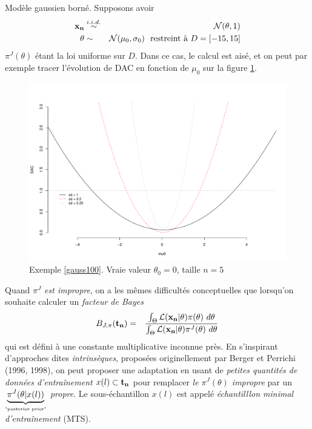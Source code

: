 \begin{exo}{Modèle gaussien borné.}\label{gauss100}
Supposons avoir \begin{eqnarray*}
{\bf x_n} & \overset{i.i.d.}{\sim} &
{\cal{N}}(\theta,1)\\
\theta & \sim & {\cal{N}}(\mu_0,\sigma_0) \ \ \text{restreint à 
$D=[-15,15]$}
\end{eqnarray*}
$\pi^J(\theta)$ étant la loi uniforme sur $D$. Dans ce cas, le calcul est aisé, et on peut par exemple tracer l'évolution de DAC en fonction de $\mu_0$ sur la figure \ref{postnormbounded1}. \\
\end{exo}

\begin{figure}[h!]
    \centering
    \includegraphics[scale=0.4]{figures/critics/postnormbounded1.pdf}
    \caption{Exemple \ref{gauss100}. Vraie valeur $\theta_0=0$, taille $n=5$}
    \label{postnormbounded1}
\end{figure}

Quand \emph{$\pi^J$ est impropre}, on a les mêmes difficultés conceptuelles que lorsqu'on souhaite calculer 
un 
\emph{facteur de Bayes}
\begin{eqnarray*}
 B_{J,\pi}({\bf
t_n}) & = & \frac{\int_{\Theta} {\cal{L}}({\bf x_n}|\theta)
\pi(\theta) \ d\theta}{\int_{\Theta} {\cal{L}}({\bf x_n}|\theta)
\pi^J(\theta) \ d\theta}\label{byf}
\end{eqnarray*}
qui est défini à une constante multiplicative inconnue près. En s'inspirant d'approches dites \emph{intrinsèques}, proposées originellement par Berger et Perrichi (1996, 1998), on peut proposer une adaptation en usant de \emph{petites quantités de données d'entraînement $x(l)\subset{\bf
t_n}$} pour remplacer \emph{le $\pi^J(\theta)$ impropre}
par un \emph{$\underbrace{\pi^J(\theta|x(l))}_{\text{\tiny "posterior prior"}}$ propre}. Le sous-échantillon $x(l)$ est appelé \emph{\it échantilllon minimal d'entraînement} (MTS). \\

